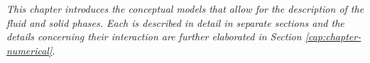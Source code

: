 
\label{cap:conceptual}

\textit{This chapter introduces the conceptual models that allow for the description of the fluid and solid phases. Each is described in detail in separate sections and the details concerning their interaction are further elaborated in Section \ref{cap:chapter-numerical}.}



